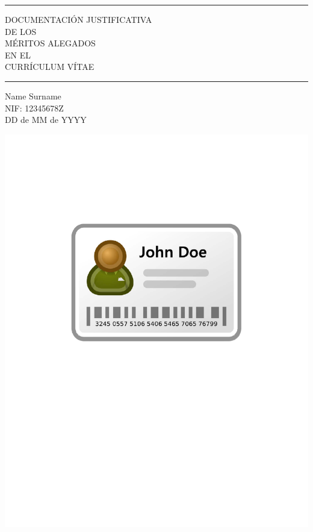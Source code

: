 \documentclass[14pt, article, twoside, a4paper]{memoir}
\begin{document}
%
%



{\Huge\bfseries
\rule{\linewidth}{1mm}
\begin{center}
\medskip
DOCUMENTACIÓN JUSTIFICATIVA \\
DE LOS \\
MÉRITOS ALEGADOS \\
EN EL \\
CURRÍCULUM VÍTAE\\
\end{center}
\rule{\linewidth}{1mm}
}
\begin{flushright}
\Large
Name Surname\\
NIF: 12345678Z\\
\medskip
DD de MM de YYYY\\
\end{flushright}

\cleardoublepage
\vspace*{4cm}
\begin{center} 
\includegraphics{id}
\end{center}
\cleardoublepage 
\end{document}
